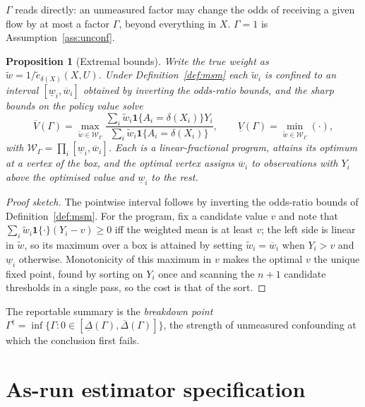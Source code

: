 \documentclass[11pt,a4paper]{article}
\theoremstyle{plain}
\newtheorem{proposition}[theorem]{Proposition}
\theoremstyle{definition}
\theoremstyle{remark}
\newcommand{\one}[1]{\mathbf 1\{#1\}}
\begin{document}
$\Gamma$ reads directly: an unmeasured factor may change the odds of receiving a given flow by at
most a factor $\Gamma$, beyond everything in $X$. $\Gamma=1$ is Assumption~\ref{ass:unconf}.

\begin{proposition}[Extremal bounds]\label{prop:msm-bounds}
Write the true weight as $\tilde w=1/\tilde e_{\delta(X)}(X,U)$. Under Definition~\ref{def:msm}
each $\tilde w_i$ is confined to an interval $[\underline w_i,\overline w_i]$ obtained by
inverting the odds-ratio bounds, and the sharp bounds on the policy value solve
\[
\overline V(\Gamma)=\max_{\tilde w\in\mathcal W_\Gamma}
\frac{\sum_i\tilde w_i\one{A_i=\delta(X_i)}Y_i}{\sum_i\tilde w_i\one{A_i=\delta(X_i)}},
\qquad
\underline V(\Gamma)=\min_{\tilde w\in\mathcal W_\Gamma}(\cdot),
\]
with $\mathcal W_\Gamma=\prod_i[\underline w_i,\overline w_i]$. Each is a linear-fractional
program, attains its optimum at a vertex of the box, and the optimal vertex assigns
$\overline w_i$ to observations with $Y_i$ above the optimised value and $\underline w_i$ to the
rest.
\end{proposition}

\begin{proof}[Proof sketch]
The pointwise interval follows by inverting the odds-ratio bounds of Definition~\ref{def:msm}.
For the program, fix a candidate value $v$ and note that
$\sum_i\tilde w_i\one{\cdot}(Y_i-v)\ge0$ iff the weighted mean is at least $v$; the left side is
linear in $\tilde w$, so its maximum over a box is attained by setting $\tilde w_i=\overline w_i$
when $Y_i>v$ and $\underline w_i$ otherwise. Monotonicity of this maximum in $v$ makes the
optimal $v$ the unique fixed point, found by sorting on $Y_i$ once and scanning the $n+1$
candidate thresholds in a single pass, so the cost is that of the sort.
\end{proof}

The reportable summary is the \emph{breakdown point}
$\Gamma^\dagger=\inf\{\Gamma:0\in[\underline\Delta(\Gamma),\overline\Delta(\Gamma)]\}$, the
strength of unmeasured confounding at which the conclusion first fails.

\section{As-run estimator specification}\label{app:asrun}
\end{document}

